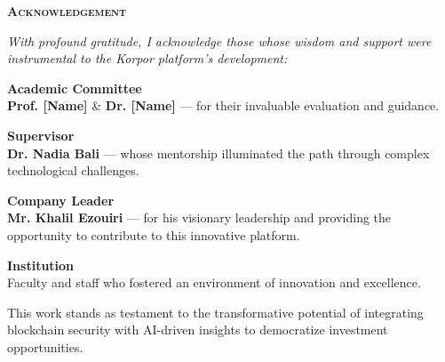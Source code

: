 \thispagestyle{empty}


\begin{center}
    \begin{minipage}{0.75\textwidth}
        \begin{center}
            \Large\textcolor{primary}{\scshape\bfseries Acknowledgement}
        \end{center}
    \end{minipage}
\end{center}

\vspace{1cm}

\begin{center}
\begin{minipage}{0.75\textwidth}
\setlength{\parindent}{0pt}
\setlength{\parskip}{1em}

{\small\itshape With profound gratitude, I acknowledge those whose wisdom and support were instrumental to the Korpor platform's development:}

\vspace{0.5cm}

{\noindent\textbf{\textcolor{primary}{Academic Committee}}\\
\textbf{Prof. [Name]} \& \textbf{Dr. [Name]} — for their invaluable evaluation and guidance.}

\vspace{0.4cm}

{\noindent\textbf{\textcolor{primary}{Supervisor}}\\
\textbf{Dr. Nadia Bali} — whose mentorship illuminated the path through complex technological challenges.}

\vspace{0.4cm}

{\noindent\textbf{\textcolor{primary}{Company Leader}}\\
\textbf{Mr. Khalil Ezouiri} — for his visionary leadership and providing the opportunity to contribute to this innovative platform.}

\vspace{0.4cm}

{\noindent\textbf{\textcolor{primary}{Institution}}\\
Faculty and staff who fostered an environment of innovation and excellence.}

\vspace{0.7cm}

{\small This work stands as testament to the transformative potential of integrating blockchain security with AI-driven insights to democratize investment opportunities.}


\end{minipage}
\end{center}
